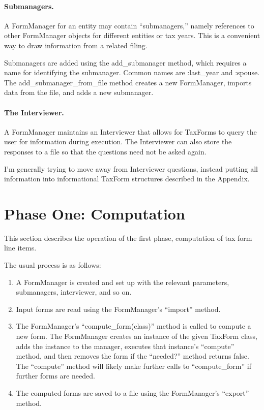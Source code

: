 \documentclass[12pt]{article}
\begin{document}
\paragraph{Submanagers.}
A FormManager for an entity may contain ``submanagers,'' namely
references to other FormManager objects for different entities or tax years.
This is a convenient way to draw information from a related filing.

Submanagers are added using the add\_submanager method, which requires a name
for identifying the submanager. Common names are :last\_year and :spouse. The
add\_submanager\_from\_file method creates a new FormManager, imports data from
the file, and adds a new submanager.

\paragraph{The Interviewer.} A FormManager maintains an Interviewer that allows
for TaxForms to query the user for information during execution. The Interviewer
can also store the responses to a file so that the questions need not be asked
again.

I'm generally trying to move away from Interviewer questions, instead putting
all information into informational TaxForm structures described in the Appendix.


\section{Phase One: Computation}

This section describes the operation of the first phase, computation of tax form
line items.

The usual process is as follows:
\begin{enumerate}
\item A FormManager is created and set up with the relevant parameters,
submanagers, interviewer, and so on.
\item Input forms are read using the FormManager's ``import'' method.
\item The FormManager's ``compute\_form(class)'' method is called to compute a
new form. The FormManager creates an instance of the given TaxForm class,
adds the instance to the manager, executes that instance's ``compute'' method,
and then removes the form if the ``needed?\@'' method returns false. The
``compute'' method will likely make further calls to ``compute\_form'' if
further forms are needed.
\item The computed forms are saved to a file using the FormManager's ``export''
method.
\end{enumerate}
\end{document}
